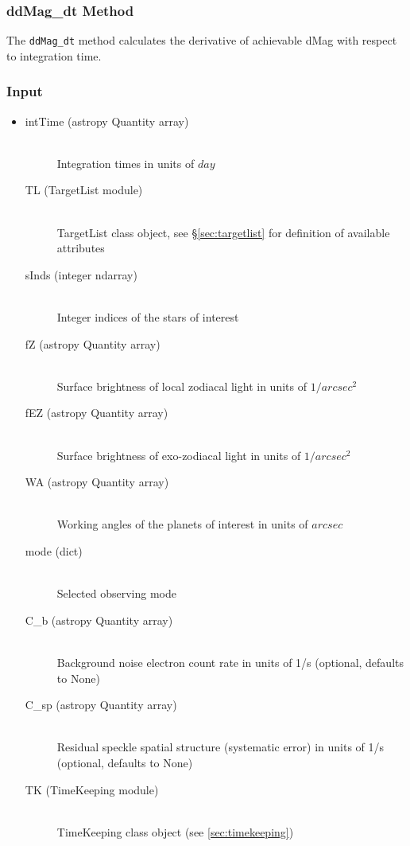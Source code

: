 \documentclass[cleanfoot]{asme2ej}
\begin{document}
\subsubsection{ddMag\_dt Method} \label{sec:ddMagdt}
The \verb+ddMag_dt+ method calculates the derivative of achievable dMag with respect to integration time.
\subsubsection*{Input}
\begin{itemize}
\item 
\begin{description}
    \item[intTime (astropy Quantity array)] \hfill \\ Integration times in units of $ day $
    \item[TL (TargetList module)] \hfill \\ TargetList class object, see \S\ref{sec:targetlist} for definition of available attributes
    \item[sInds (integer ndarray)] \hfill \\ Integer indices of the stars of interest
    \item[fZ (astropy Quantity array)] \hfill \\ Surface brightness of local zodiacal light in units of $ 1/arcsec^2 $
    \item[fEZ (astropy Quantity array)] \hfill \\ Surface brightness of exo-zodiacal light in units of $ 1/arcsec^2 $
    \item[WA (astropy Quantity array)] \hfill \\ Working angles of the planets of interest in units of $ arcsec $
    \item[mode (dict)] \hfill \\ Selected observing mode
    \item[C\_b (astropy Quantity array)] \hfill \\ Background noise electron count rate in units of 1/s (optional, defaults to None)
    \item[C\_sp (astropy Quantity array)] \hfill \\ Residual speckle spatial structure (systematic error) in units of 1/s (optional, defaults to None)
    \item[TK (TimeKeeping module)] \hfill \\ TimeKeeping class object (see \ref{sec:timekeeping})
\end{description}
\end{itemize}
\end{document}
